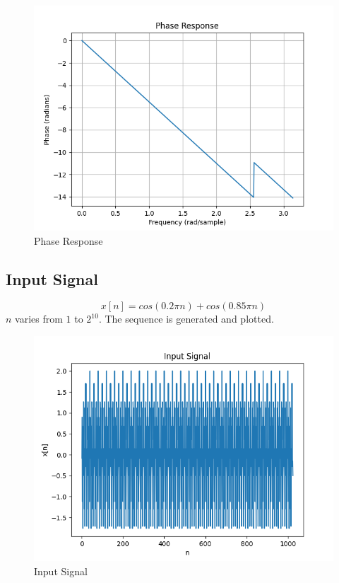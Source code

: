 \documentclass[11pt, a4paper]{article}
\begin{document}
\begin{figure}[!tbh]
   	\centering
  \includegraphics[scale=0.5]{h_phase.png} 
    \caption{Phase Response} 	
   \end{figure}  
   
\subsection{Input Signal}
$$x[n] = cos(0.2\pi n)+cos(0.85\pi n)$$
$n$ varies from $1$ to $2^{10}$. The sequence is generated and plotted. 

\begin{figure}[!tbh]
   	\centering
  \includegraphics[scale=0.5]{x.png} 
    \caption{Input Signal} 	
   \end{figure}  
   
\end{document}
